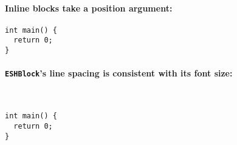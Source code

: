 \documentclass{article}
\begin{document}
\paragraph{Inline blocks take a position argument:}
\begin{verbatim}
int main() {
  return 0;
}
\end{verbatim}

\paragraph{\texttt{ESHBlock}'s line spacing is consistent with its font size:}~
\bgroup\def\ESHFontSize{\tiny}
\begin{verbatim}
int main() {
  return 0;
}
\end{verbatim}
\egroup
\end{document}
